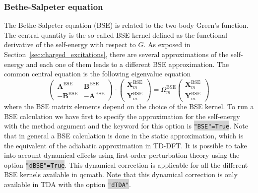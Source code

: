 \documentclass[aip,jcp,reprint,noshowkeys,superscriptaddress]{revtex4-1}
\newcommand{\BSE}{\text{BSE}}
\newcommand{\bX}{\bm{X}}
\newcommand{\bY}{\bm{Y}}
\newcommand{\bA}{\boldsymbol{A}}
\newcommand{\bB}{\boldsymbol{B}}
\newcommand{\Ome}{\Omega}
\newcommand{\keyword}[1]{{\colorbox{lightgray}{\texttt{#1}}}}
\begin{document}
\subsubsection*{Bethe-Salpeter equation}
The Bethe-Salpeter equation (BSE) is related to the two-body Green's function. \cite{Strinati_1988} The central quantity is the so-called BSE kernel defined as the functional derivative of the self-energy with respect to $G$. As exposed in Section~\ref{sec:charged_excitations}, there are several approximations of the self-energy and each one of them leads to a different BSE approximation. The common central equation is the following eigenvalue equation
\begin{equation}
    \begin{pmatrix}
    	\bA^{\BSE} & \bB^{\BSE} 
		\\
	    -\bB^{\BSE} & -\bA^{\BSE}
    \end{pmatrix}
	\cdot 
    \begin{pmatrix}
	    \bX_{m}^{\BSE} 
	    \\
	    \bY_{m}^{\BSE}
    \end{pmatrix}
	=
	\Ome_{m}^{\BSE}
	\begin{pmatrix}
		\bX_{m}^{\BSE} 
		\\
		\bY_{m}^{\BSE}
	\end{pmatrix}
\end{equation}
where the BSE matrix elements depend on the choice of the BSE kernel. To run a BSE calculation we have first to specify the approximation for the self-energy with the method argument and the keyword for this option is \keyword{"BSE"=True}. Note that in general a BSE calculation is done in the static approximation, which is the equivalent of the adiabatic approximation in TD-DFT. It is possible to take into account dynamical effects using first-order perturbation theory \cite{Loos_2020h} using the option \keyword{"dBSE"=True}. This dynamical correction is applicable for all the different BSE kernels available in qcmath. Note that this dynamical correction is only available in TDA with the option \keyword{"dTDA"}.

\end{document}
